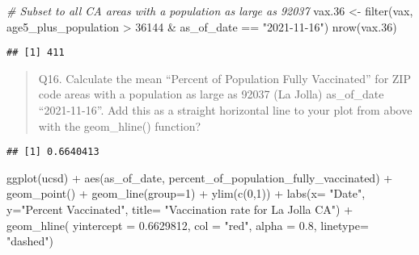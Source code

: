 \documentclass[
]{article}
\newenvironment{Shaded}{\begin{snugshade}}{\end{snugshade}}
\newcommand{\AttributeTok}[1]{\textcolor[rgb]{0.77,0.63,0.00}{#1}}
\newcommand{\CommentTok}[1]{\textcolor[rgb]{0.56,0.35,0.01}{\textit{#1}}}
\newcommand{\DecValTok}[1]{\textcolor[rgb]{0.00,0.00,0.81}{#1}}
\newcommand{\FloatTok}[1]{\textcolor[rgb]{0.00,0.00,0.81}{#1}}
\newcommand{\FunctionTok}[1]{\textcolor[rgb]{0.00,0.00,0.00}{#1}}
\newcommand{\NormalTok}[1]{#1}
\newcommand{\OtherTok}[1]{\textcolor[rgb]{0.56,0.35,0.01}{#1}}
\newcommand{\SpecialCharTok}[1]{\textcolor[rgb]{0.00,0.00,0.00}{#1}}
\newcommand{\StringTok}[1]{\textcolor[rgb]{0.31,0.60,0.02}{#1}}
\begin{document}
\begin{Shaded}
\begin{Highlighting}[]
\CommentTok{\# Subset to all CA areas with a population as large as 92037}
\NormalTok{vax}\FloatTok{.36} \OtherTok{\textless{}{-}} \FunctionTok{filter}\NormalTok{(vax, age5\_plus\_population }\SpecialCharTok{\textgreater{}} \DecValTok{36144} \SpecialCharTok{\&}
\NormalTok{                as\_of\_date }\SpecialCharTok{==} \StringTok{"2021{-}11{-}16"}\NormalTok{)}
\FunctionTok{nrow}\NormalTok{(vax}\FloatTok{.36}\NormalTok{)}
\end{Highlighting}
\end{Shaded}

\begin{verbatim}
## [1] 411
\end{verbatim}

\begin{quote}
Q16. Calculate the mean ``Percent of Population Fully Vaccinated'' for
ZIP code areas with a population as large as 92037 (La Jolla)
as\_of\_date ``2021-11-16''. Add this as a straight horizontal line to
your plot from above with the geom\_hline() function?
\end{quote}

\begin{Shaded}
\end{Shaded}

\begin{verbatim}
## [1] 0.6640413
\end{verbatim}

\begin{Shaded}
\begin{Highlighting}[]
\FunctionTok{ggplot}\NormalTok{(ucsd) }\SpecialCharTok{+}
  \FunctionTok{aes}\NormalTok{(as\_of\_date,}
\NormalTok{      percent\_of\_population\_fully\_vaccinated) }\SpecialCharTok{+}
  \FunctionTok{geom\_point}\NormalTok{() }\SpecialCharTok{+}
  \FunctionTok{geom\_line}\NormalTok{(}\AttributeTok{group=}\DecValTok{1}\NormalTok{) }\SpecialCharTok{+}
  \FunctionTok{ylim}\NormalTok{(}\FunctionTok{c}\NormalTok{(}\DecValTok{0}\NormalTok{,}\DecValTok{1}\NormalTok{)) }\SpecialCharTok{+}
  \FunctionTok{labs}\NormalTok{(}\AttributeTok{x=} \StringTok{"Date"}\NormalTok{, }\AttributeTok{y=}\StringTok{"Percent Vaccinated"}\NormalTok{, }\AttributeTok{title=} \StringTok{"Vaccination rate for La Jolla CA"}\NormalTok{)  }\SpecialCharTok{+} 
  \FunctionTok{geom\_hline}\NormalTok{( }\AttributeTok{yintercept =} \FloatTok{0.6629812}\NormalTok{, }\AttributeTok{col =} \StringTok{"red"}\NormalTok{, }
              \AttributeTok{alpha =} \FloatTok{0.8}\NormalTok{, }\AttributeTok{linetype=} \StringTok{"dashed"}\NormalTok{)}
\end{Highlighting}
\end{Shaded}
\end{document}
